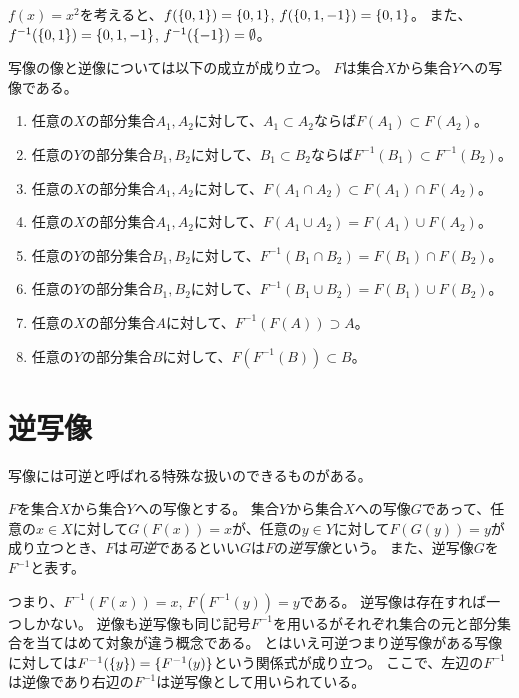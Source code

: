 \begin{example}
$f(x) = x^2$を考えると、$f(\{0, 1\}) = \{0, 1\}$, $f(\{0, 1, -1\}) = \{0, 1\}$。
また、$f^{-1}(\{0, 1\}) = \{0, 1, -1\}$, $f^{-1}(\{-1\}) = \emptyset$。
\end{example}

写像の像と逆像については以下の成立が成り立つ。
$F$は集合$X$から集合$Y$への写像である。
\begin{enumerate}
\item
任意の$X$の部分集合$A_1, A_2$に対して、$A_1 \subset A_2$ならば$F(A_1) \subset F(A_2)$。
\item
任意の$Y$の部分集合$B_1, B_2$に対して、$B_1 \subset B_2$ならば$F^{-1}(B_1) \subset F^{-1}(B_2)$。
\item
任意の$X$の部分集合$A_1, A_2$に対して、$F(A_1\cap A_2) \subset F(A_1)\cap F(A_2)$。
\item
任意の$X$の部分集合$A_1, A_2$に対して、$F(A_1\cup A_2) = F(A_1)\cup F(A_2)$。
\item
任意の$Y$の部分集合$B_1, B_2$に対して、$F^{-1}(B_1\cap B_2) = F(B_1)\cap F(B_2)$。
\item
任意の$Y$の部分集合$B_1, B_2$に対して、$F^{-1}(B_1\cup B_2) = F(B_1)\cup F(B_2)$。
\item
任意の$X$の部分集合$A$に対して、$F^{-1}(F(A)) \supset A$。
\item
任意の$Y$の部分集合$B$に対して、$F(F^{-1}(B)) \subset B$。
\end{enumerate}

\section{逆写像}

写像には可逆と呼ばれる特殊な扱いのできるものがある。

\begin{definition}[逆写像]
$F$を集合$X$から集合$Y$への写像とする。
集合$Y$から集合$X$への写像$G$であって、任意の$x \in X$に対して$G(F(x)) = x$が、任意の$y \in Y$に対して$F(G(y)) = y$が成り立つとき、$F$は\emph{可逆}であるといい$G$は$F$の\emph{逆写像}という。
また、逆写像$G$を$F^{-1}$と表す。
\end{definition}

つまり、$F^{-1}(F(x)) = x$, $F(F^{-1}(y)) = y$である。
逆写像は存在すれば一つしかない。
逆像も逆写像も同じ記号$F^{-1}$を用いるがそれぞれ集合の元と部分集合を当てはめて対象が違う概念である。
とはいえ可逆つまり逆写像がある写像に対しては$F^{-1}(\{y\}) = \{F^{-1}(y)\}$という関係式が成り立つ。
ここで、左辺の$F^{-1}$は逆像であり右辺の$F^{-1}$は逆写像として用いられている。

